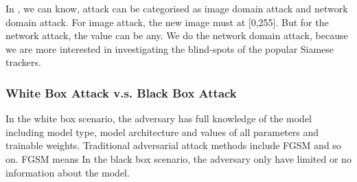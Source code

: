 \documentclass{article}
\begin{document}
In \cite{karmon2018lavan}, we can know, attack can be categorised as image domain attack and network domain attack. For image attack, the new image must at [0,255]. But for the network attack, the value can be any. We do the network domain attack, because we are more interested in investigating the blind-spots of the popular Siamese trackers.

\subsubsection{White Box Attack v.s. Black Box Attack}

In the white box scenario, the adversary has full knowledge of the model including model type, model architecture and values of all parameters and trainable weights.
Traditional adversarial attack methods include FGSM \cite{FGSM} and so on. FGSM means In the black box scenario, the adversary only have limited or no information about the model.
\end{document}
